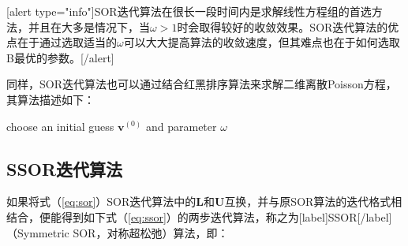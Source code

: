 \documentclass[12pt, UTF8, nofonts]{ctexart}
\begin{document}
[alert type="info"]SOR迭代算法在很长一段时间内是求解线性方程组的首选方法，并且在大多是情况下，当$\omega>1$时会取得较好的收敛效果。SOR迭代算法的优点在于通过选取适当的$\omega$可以大大提高算法的收敛速度，但其难点也在于如何选取B最优的参数。[/alert]

同样，SOR迭代算法也可以通过结合红黑排序算法来求解二维离散Poisson方程，其算法描述如下：

\begin{algorithm}[H]
    choose an initial guess $\boldsymbol{v}^{(0)}$ and parameter $\omega$ \;
\end{algorithm}

\subsection*{SSOR迭代算法}

如果将式（\ref{eq:sor}）SOR迭代算法中的$\boldsymbol{L}$和$\boldsymbol{U}$互换，并与原SOR算法的迭代格式相结合，便能得到如下式（\ref{eq:ssor}）的两步迭代算法，称之为[label]SSOR[/label]（Symmetric SOR，对称超松弛）算法，即：
\end{document}
